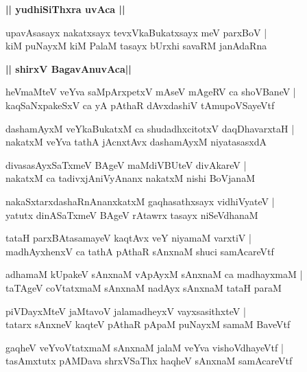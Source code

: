 \documentclass[twoside,12pt,openright]{book}
\newcounter{shloka}[chapter]
\def\uvaca#1{\centerline{{\large\textbf{#1}}}}
\begin{document}
\uvaca{|| yudhiSiThxra uvAca ||}

\begin{shloka}%
upavAsasayx nakatxsayx tevxVkaBukatxsayx meV parxBoV |\\
kiM puNayxM kiM PalaM tasayx bUrxhi savaRM janAdaRna
\end{shloka}

\uvaca{|| shirxV BagavAnuvAca||}

\begin{shloka}%
heVmaMteV veYva saMpArxpetxV mAseV mAgeRV ca shoVBaneV |\\
kaqSaNxpakeSxV ca yA pAthaR dAvxdashiV tAmupoVSayeVtf
\end{shloka}

\begin{shloka}%
dashamAyxM veYkaBukatxM ca shudadhxcitotxV daqDhavarxtaH |\\
nakatxM veYva tathA jAcnxtAvx dashamAyxM niyatasasxdA
\end{shloka}

\begin{shloka}%
divasasAyxSaTxmeV BAgeV maMdiVBUteV divAkareV |\\
nakatxM ca tadivxjAniVyAnanx nakatxM nishi BoVjanaM
\end{shloka}

\begin{shloka}%
nakaSxtarxdashaRnAnanxkatxM gaqhasathxsayx vidhiVyateV |\\
yatutx dinASaTxmeV BAgeV rAtawrx tasayx niSeVdhanaM 
\end{shloka}

\begin{shloka}%
tataH parxBAtasamayeV kaqtAvx veY niyamaM varxtiV |\\
madhAyxhenxV ca tathA pAthaR sAnxnaM shuci samAcareVtf 
\end{shloka}

\begin{shloka}%
adhamaM kUpakeV sAnxnaM vApAyxM sAnxnaM ca madhayxmaM |\\
taTAgeV coVtatxmaM sAnxnaM nadAyx sAnxnaM tataH paraM 
\end{shloka}

\begin{shloka}%
piVDayxMteV jaMtavoV jalamadheyxV vayxsasithxteV |\\
tatarx sAnxneV kaqteV pAthaR pApaM puNayxM samaM BaveVtf
\end{shloka}

\begin{shloka}%
gaqheV veYvoVtatxmaM sAnxnaM jalaM veYva vishoVdhayeVtf |\\
tasAmxtutx pAMDava shrxVSaThx haqheV sAnxnaM samAcareVtf
\end{shloka}
\end{document}
